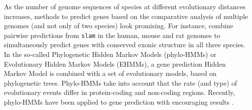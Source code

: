 
As the number of genome sequences of species at different evolutionary
distances increases, methods to predict genes based on the comparative
analysis of multiple genomes (and not only of two species) look
promising. For instance, \cite{dewey:2004a} combine pairwise
predictions from \texttt{slam} in the human, mouse and rat genomes to
simultaneously predict genes with conserved exonic structure in all
three species. In the so-called Phylogenetic Hidden Markov Models
(phylo-HMMs) or Evolutionary Hidden Markov Models (EHMMs), a gene
prediction Hidden Markov Model is combined with a set of evolutionary
models, based on phylogenetic trees. Phylo-HMMs take into account
that the rate (and type) of evolutionary events differ in
protein-coding and non-coding regions. Recently, phylo-HMMs have been
applied to gene prediction with encouraging results
\citep{pedersen:2003a, siepel:2004a}.

